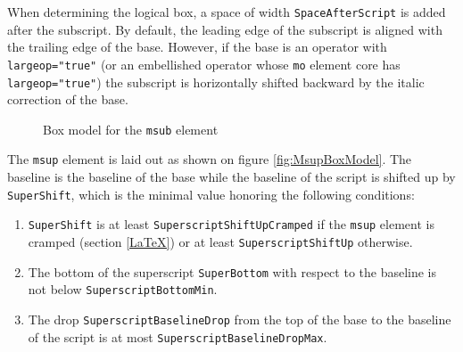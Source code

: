 When determining
the logical box, a space of width {\tt SpaceAfterScript}
is added after
the subscript. By default, the leading edge of the subscript is aligned with
the trailing edge of the base. However, if the base is an operator with
{\tt largeop="true"} (or an embellished operator whose {\tt mo} element core
has {\tt largeop="true"}) the subscript is horizontally shifted backward
by the italic correction of the base.

\begin{figure}
\centering
\caption{Box model for the {\tt msub} element}
\label{fig:MsubBoxModel}
\end{figure}

The {\tt msup} element is laid out as shown on figure \ref{fig:MsupBoxModel}.
The baseline is the baseline of the base while the baseline of the script is
shifted up by {\tt SuperShift}, which is the minimal value honoring the
following conditions:
\begin{enumerate}
\item {\tt SuperShift} is at least
  {\tt SuperscriptShiftUpCramped} if the {\tt msup} element is
  cramped (section \ref{LaTeX}) or at least
  {\tt SuperscriptShiftUp} otherwise.
\item The bottom of the superscript {\tt SuperBottom} with respect to the
  baseline is not below {\tt SuperscriptBottomMin}.
\item The drop {\tt SuperscriptBaselineDrop} from the top of the base to
  the baseline of the script is at most {\tt SuperscriptBaselineDropMax}.
\end{enumerate}

